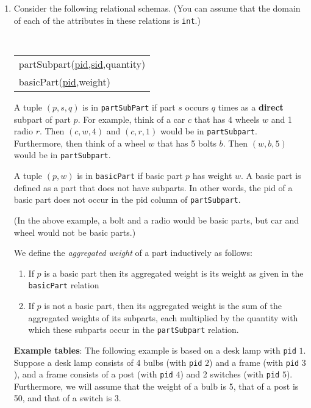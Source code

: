 \documentclass[10pt]{article}
\begin{document}
\begin{enumerate}[resume]



\item %
Consider the following relational schemas.  (You can assume that the domain of each of the attributes in these relations is {\tt int}.)
\begin{center}
{\tt 
\begin{tabular}{l}
partSubpart(\underline{pid,sid},quantity) \\
basicPart(\underline{pid},weight)
\end{tabular}
}
\end{center}

A tuple $(p, s, q)$  
is in {\tt partSubPart} if  part $s$ occurs $q$ times as a {\bf
    direct} subpart of part $p$.  For example, think of a car $c$ that has 4
  wheels $w$ and 1 radio $r$. Then $(c,w,4)$ and $(c,r,1)$ would be in {\tt partSubpart}.  Furthermore, then think of a wheel $w$ that has 5 bolts $b$.
  Then $(w,b,5)$ would be in {\tt partSubpart}.
  
  A  tuple $(p, w)$ is in {\tt basicPart} if basic part $p$ has
  weight $w$.  A basic part is defined as a part that does not have
  subparts.  In other words, the pid of a basic part does not occur
  in the pid column of {\tt partSubpart}.

 (In the above example, a bolt and a radio would be basic parts, but car and
 wheel would not be basic parts.)

We define the \emph{aggregated weight} of a part inductively as follows:
\begin{enumerate}
\item If $p$ is a basic part then its aggregated weight is its weight as given in
the {\tt basicPart} relation
\item If $p$ is not a basic part, then its aggregated weight is the
sum of the aggregated weights of its subparts, each multiplied by the
quantity with which these subparts occur in the {\tt partSubpart} relation.
\end{enumerate}

\textbf{Example tables}: The following example is based on a desk
lamp with {\tt pid} $1$. Suppose a desk lamp consists of 4 bulbs (with {\tt pid} $2$)  and a frame (with {\tt pid} $3$), and a frame
consists of a post (with {\tt pid} $4$) and 2 switches (with {\tt pid} $5$). 
Furthermore, we will assume that the weight of a bulb is 5, that of a post is 50, and that of a switch
is 3. 


\end{enumerate}
\end{document}
